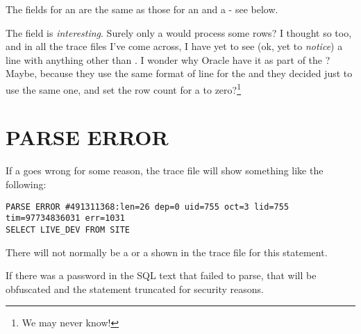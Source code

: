 The fields for an  are the same as those for an  and a  - see below.

The  field is \emph{interesting}. Surely only a  would process some rows? I thought so too, and in all the trace files I've come across, I have yet to see (ok, yet to \emph{notice}) a  line with anything other than . I wonder why Oracle have it as part of the ? Maybe, because they use the same format of line for the  and  they decided just to use the same one, and set the row count for a  to zero?\footnote{We may never know!}

\newpage\section{PARSE ERROR}\label{parse-error}

If a  goes wrong for some reason, the trace file will show something like the following:

\begin{lstlisting}[numbers=none,caption={Parse Error Line}]
PARSE ERROR #491311368:len=26 dep=0 uid=755 oct=3 lid=755 tim=97734836031 err=1031
SELECT LIVE_DEV FROM SITE
\end{lstlisting}

There will not normally be a  or a  shown in the trace file for this statement.

If there was a password in the SQL text that failed to parse, that will be obfuscated and the statement truncated for security reasons.

